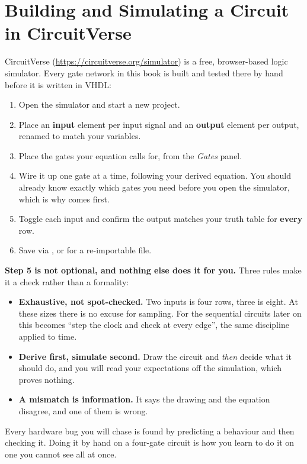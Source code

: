 \section{Building and Simulating a Circuit in CircuitVerse}
\label{c1:a3}
CircuitVerse (\url{https://circuitverse.org/simulator}) is a free, browser-based logic simulator.
Every gate network in this book is built and tested there by hand before it is written in VHDL:
\begin{enumerate}
  \item Open the simulator and start a new project.
  \item Place an \textbf{input} element per input signal and an \textbf{output} element per output,
    renamed to match your variables.
  \item Place the gates your equation calls for, from the \emph{Gates} panel.
  \item Wire it up one gate at a time, following your derived equation. You should already know
    exactly which gates you need before you open the simulator, which is why  comes
    first.
  \item Toggle each input and confirm the output matches your truth table for \textbf{every} row.
  \item Save via , or  for a
    re-importable  file.
\end{enumerate}
\textbf{Step 5 is not optional, and nothing else does it for you.} Three rules make it a check
rather than a formality:
\begin{itemize}
  \item \textbf{Exhaustive, not spot-checked.} Two inputs is four rows, three is eight. At these
    sizes there is no excuse for sampling. For the sequential circuits later on this becomes ``step
    the clock and check at every edge'', the same discipline applied to time.
  \item \textbf{Derive first, simulate second.} Draw the circuit and \emph{then} decide what it
    should do, and you will read your expectations off the simulation, which proves nothing.
  \item \textbf{A mismatch is information.} It says the drawing and the equation disagree, and one
    of them is wrong.
\end{itemize}
Every hardware bug you will chase is found by predicting a behaviour and then checking it. Doing
it by hand on a four-gate circuit is how you learn to do it on one you cannot see all at once.

